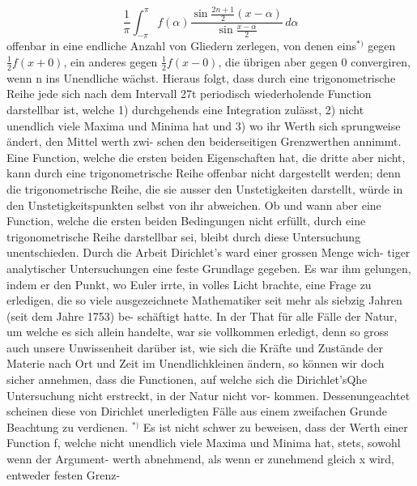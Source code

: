 \documentclass[11pt,a4paper]{article}
\begin{document}
\[
\frac{1}{\pi} \int_{-\pi}^{\pi} f(\alpha) \frac{\sin \frac{2n+1}{2}(x-\alpha)}{\sin \frac{x-\alpha}{2}}\, d\alpha
\]
offenbar  in  eine  endliche  Anzahl  von  Gliedern  zerlegen,  von  denen
eins$^{*)}$  gegen $\frac{1}{2}f(x+0)$,  ein  anderes  gegen  $\frac{1}{2}f(x-0)$,  die  übrigen
aber  gegen  0  convergiren,  wenn  n  ins  Unendliche  wächst.
Hieraus  folgt,  dass  durch  eine  trigonometrische  Reihe  jede  sich
nach  dem  Intervall  27t  periodisch  wiederholende  Function  darstellbar
ist,  welche
1)  durchgehends  eine  Integration  zulässt,
2)  nicht  unendlich  viele  Maxima  und  Minima  hat  und
3)  wo  ihr  Werth  sich  sprungweise  ändert,  den  Mittel werth  zwi-
schen den  beiderseitigen  Grenzwerthen  annimmt.
Eine  Function,  welche  die  ersten  beiden  Eigenschaften  hat,  die
dritte  aber  nicht,  kann  durch  eine  trigonometrische  Reihe  offenbar
nicht  dargestellt  werden;  denn  die  trigonometrische  Reihe,  die  sie
ausser  den  Unstetigkeiten  darstellt,  würde  in  den  Unstetigkeitspunkten
selbst  von  ihr  abweichen.  Ob  und  wann  aber  eine  Function,  welche
die  ersten  beiden  Bedingungen  nicht  erfüllt,  durch  eine  trigonometrische
Reihe  darstellbar  sei,  bleibt  durch  diese  Untersuchung  unentschieden.
Durch  die  Arbeit  Dirichlet's  ward  einer  grossen  Menge  wich-
tiger analytischer  Untersuchungen  eine  feste  Grundlage  gegeben.  Es
war  ihm  gelungen,  indem  er  den  Punkt,  wo  Euler  irrte,  in  volles
Licht  brachte,  eine  Frage  zu  erledigen,  die  so  viele  ausgezeichnete
Mathematiker  seit  mehr  als  siebzig  Jahren  (seit  dem  Jahre  1753)  be-
schäftigt hatte.  In  der  That  für  alle  Fälle  der  Natur,  um  welche  es
sich  allein  handelte,  war  sie  vollkommen  erledigt,  denn  so  gross  auch
unsere  Unwissenheit  darüber  ist,  wie  sich  die  Kräfte  und  Zustände  der
Materie  nach  Ort  und  Zeit  im  Unendlichkleinen  ändern,  so  können
wir  doch  sicher  annehmen,  dass  die  Functionen,  auf  welche  sich  die
Dirichlet'sQhe  Untersuchung  nicht  erstreckt,  in  der  Natur  nicht  vor-
kommen.
Dessenungeachtet  scheinen  diese  von  Dirichlet  unerledigten  Fälle
aus  einem  zweifachen  Grunde  Beachtung  zu  verdienen.
$^{*)}$  Es  ist  nicht  schwer  zu  beweisen,  dass  der  Werth  einer  Function  f,  welche
nicht  unendlich  viele  Maxima  und  Minima  hat,  stets,  sowohl  wenn  der  Argument-
werth  abnehmend,  als  wenn  er  zunehmend  gleich  x  wird,  entweder  festen  Grenz-
\end{document}
